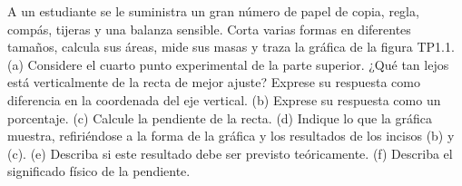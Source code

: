 \item A un estudiante se le suministra un gran número de papel de copia, regla, compás, tijeras y una balanza sensible. Corta varias formas en diferentes tamaños, calcula sus áreas, mide sus masas y traza la gráfica de la figura TP1.1. (a) Considere el cuarto punto experimental de la parte superior. ¿Qué tan lejos está verticalmente de la recta de mejor ajuste? Exprese su respuesta como diferencia en la coordenada del eje vertical. (b) Exprese su respuesta como un porcentaje. (c) Calcule la pendiente de la recta. (d) Indique lo que la gráfica muestra, refiriéndose a la forma de la gráfica y los resultados de los incisos (b) y (c). (e) Describa si este resultado debe ser previsto teóricamente. (f) Describa el significado físico de la pendiente.
